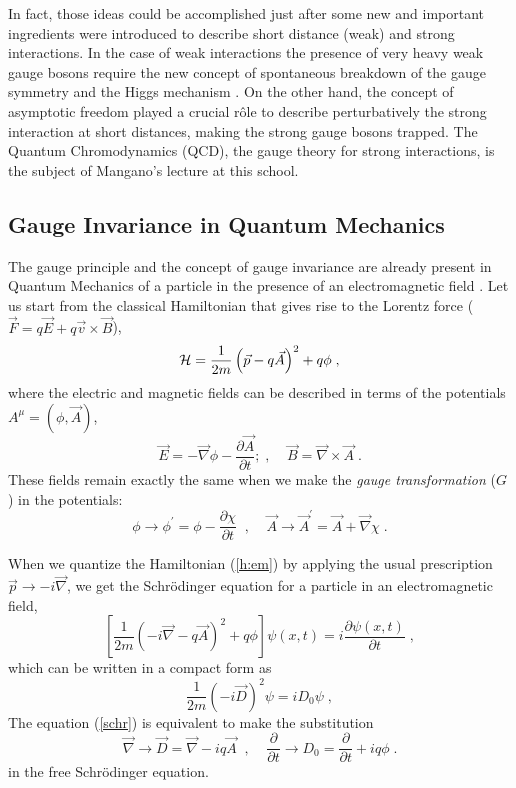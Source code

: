 \documentclass[12pt]{report}
\newcommand{\del}{\partial}
\begin{document}
In fact, those ideas could be accomplished just after some new and
important ingredients were introduced to describe short distance
(weak) and strong interactions. In the case of weak interactions the
presence of very heavy weak gauge bosons require the new concept of
spontaneous breakdown of the gauge symmetry and the Higgs mechanism
\cite{Higgs:64,Englert:64,Guralnik:64}. On the other hand, the
concept of asymptotic freedom \cite{Gross:73,Politzer:73} played a
crucial r\^ole to describe perturbatively the strong interaction at
short distances, making the strong gauge bosons trapped. The Quantum
Chromodynamics (QCD), the gauge theory for strong interactions, is
the subject of Mangano's lecture at this school.




\subsection{Gauge Invariance in Quantum Mechanics} \indent

The gauge principle and the concept of gauge invariance are already
present in Quantum Mechanics of a particle in the presence of an
electromagnetic field \cite{Aitchison:90}. Let us start from the
classical Hamiltonian that gives rise to the Lorentz force ($\vec{F}
= q \vec{E} + q \vec{v}\times\vec{B}$),
\begin{equation}
{\cal H} =  \frac{1}{2m} \left(\vec{p} - q \vec{A}\right)^2 + q \phi
\; ,
\label{h:em}
\end{equation}
where the electric and magnetic fields can be described in terms of 
the potentials  $A^\mu = (\phi, \vec{A})$, 
\[
\vec{E} = - \vec{\nabla} \phi - \frac{\del \vec{A}}{\del t} ;\;,
\;\;\;\;
\vec{B} = \vec{\nabla} \times \vec{A} \; .
\]
These fields remain exactly the same when we make the {\it gauge
transformation} ($G$) in the potentials:
\begin{equation}
{ \phi \to \phi^\prime = \phi - \frac{\del \chi}{\del t}
\;\;, \;\;\;\;
\vec{A} \to \vec{A}^\prime = \vec{A} + \vec{\nabla} \chi } \; .
\label{gauge:em}
\end{equation}

When we quantize the Hamiltonian (\ref{h:em}) by applying the
usual prescription $\vec{p} \to -i \vec{\nabla}$, we get the
Schr\"odinger equation for a particle in an electromagnetic field,
\[
\left[ \frac{1}{2m} \left(-i \vec{\nabla} - q \vec{A}\right)^2 
+ q \phi \right] \psi(x,t) = i \frac{\del \psi(x,t)}{\del t} \; ,
\]
which can be written in a compact form as
\begin{equation}
\frac{1}{2m} (-i \vec{D})^2  \psi = i D_0 \psi \; ,
\label{schr}
\end{equation}
The equation (\ref{schr}) is equivalent to make the substitution
\[
\vec{\nabla} \to \vec{D} = \vec{\nabla} - i q \vec{A}
\;\;, \;\;\;\;
\frac{\del}{\del t} \to D_0 = \frac{\del}{\del t} + i q
\phi \; .
\]
in the free Schr\"odinger equation.
\end{document}
